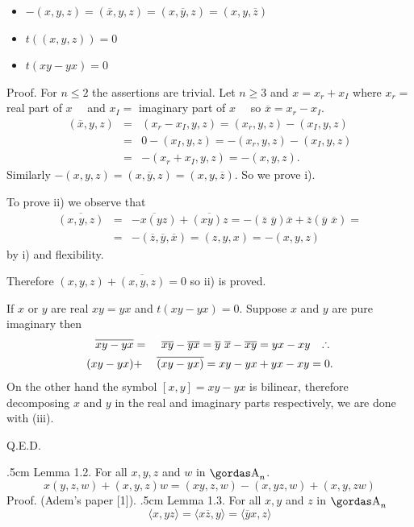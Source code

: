 \begin{itemize}
\item[i)]$-(x,y,z)=(\overline{x},y,z)=(x,\overline{y},z)=(x,y,\overline{z})$
\item[ii)]$t((x,y,z))=0$
\item[iii)]$t(xy-yx)=0$
\end{itemize}
{\bsbf Proof.} For $n\le 2$ the assertions are trivial. Let $n\ge 3$ and 
$x=x_{r}+x_{I}$ where $x_{r}=$ real part of $x\quad$ and 
$x_{I}=$ imaginary part of
$x\quad$ so $\overline{x}=x_{r}-x_{I}$.
\begin{eqnarray*}
(\overline{x},y,z)&=&(x_{r}-x_{I},y,z)=(x_{r},y,z)-(x_{I},y,z)\\
&=&0-(x_{I},y,z)=-(x_{r},y,z)-(x_{I},y,z)\\
&=&-(x_{r}+x_{I},y,z)=-(x,y,z).
\end{eqnarray*}
Similarly $-(x,y,z)=(x,\overline{y},z)=(x,y,\overline{z})$. So we prove i).
\par 
To prove ii) we observe that
\begin{eqnarray*}
\overline{(x,y,z)}&=&\overline{-x(yz)}+\overline{(xy)z}=-
(\overline{z}\,\,\overline{y})\overline{x}+\overline{z}(\overline{y}\,\,
\overline{x})=\\
&=&-(\overline{z}, \overline{y}, \overline{x})=(z,y,x)=-(x,y,z)
\end{eqnarray*}
by i) and flexibility.
\par 
Therefore $(x,y,z)+\overline{(x,y,z)}=0$ so ii) is proved. 
\par 
If $x$ or $y$ are real
$xy=yx$ and $t(xy-yx)=0$. Suppose $x$ and $y$ are pure imaginary then
\begin{eqnarray*}
\overline{xy-yx}&=&\overline{xy}-\overline{yx}=\overline{y}\,\,\overline{x}-
\overline{x}\overline{y}=yx-xy\quad \triangulo \\
(xy-yx)&+&\overline{(xy-yx)}=xy-yx+yx-xy=0.
\end{eqnarray*}
On the other hand the symbol $[x,y]=xy-yx$ is bilinear, therefore decomposing
$x$ and $y$ in the real and imaginary parts respectively, we are done with 
(iii).
\begin{flushright}
Q.E.D.
\end{flushright}
\vglue.5cm
\noindent
{\bsbf Lemma 1.2.} For all $x,y,z$ and $w$ in $\a_{n}$.
$$x(y,z,w)+(x,y,z)w=(xy,z,w)-(x,yz,w)+(x,y,zw)$$
{\bsbf Proof.} (Adem's paper [1]).
\vglue.5cm
\noindent
{\bsbf Lemma 1.3.} For all $x,y$ and $z$ in $\a_{n}$%
$$\langle x,yz\rangle=\langle x\overline{z},y\rangle=
\langle\overline{y}x,z\rangle$$
